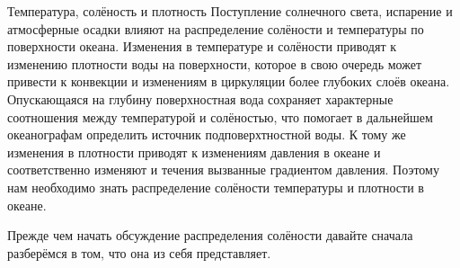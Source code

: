 
\begin{chapter}{Температура, солёность и плотность}\label{chap:6}
Поступление солнечного света, испарение и атмосферные осадки влияют на
распределение солёности и температуры по поверхности океана. Изменения
в температуре и солёности приводят к изменению плотности воды на
поверхности, которое в свою очередь может привести к конвекции и
изменениям в циркуляции более глубоких слоёв океана. Опускающаяся на
глубину поверхностная вода сохраняет характерные соотношения между
температурой и солёностью, что помогает в дальнейшем океанографам
определить источник подповерхтностной воды. К тому же изменения в
плотности приводят к изменениям давления в океане и соответственно
изменяют и течения вызванные градиентом давления. Поэтому нам
необходимо знать распределение солёности температуры и плотности в
океане. 
%

Прежде чем начать обсуждение распределения солёности давайте
сначала разберёмся в том, что она из себя представляет.
%



\end{chapter}
